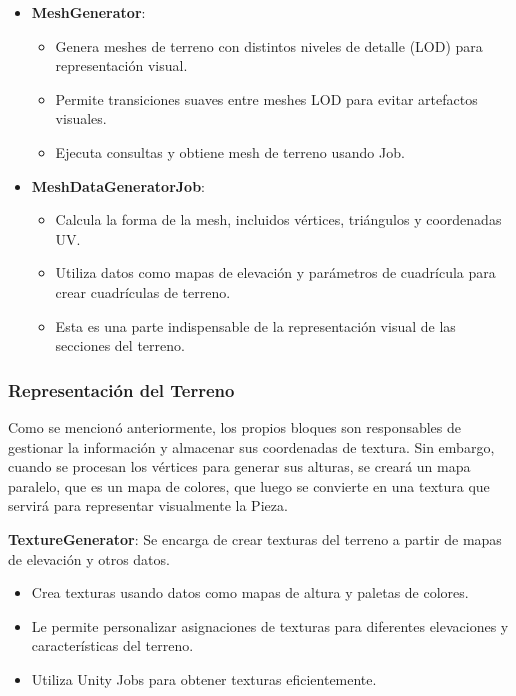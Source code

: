 \begin{itemize}
    \item \textbf{MeshGenerator}:
    \begin{itemize}
        \item Genera meshes de terreno con distintos niveles de detalle (LOD) para representación visual.
	    \item Permite transiciones suaves entre meshes LOD para evitar artefactos visuales.
	    \item Ejecuta consultas y obtiene mesh de terreno usando Job. 

    \end{itemize}

    \item \textbf{MeshDataGeneratorJob}: 
    \begin{itemize}
        \item Calcula la forma de la mesh, incluidos vértices, triángulos y coordenadas UV.
	\item Utiliza datos como mapas de elevación y parámetros de cuadrícula para crear cuadrículas de terreno. 
	\item Esta es una parte indispensable de la representación visual de las secciones del terreno.
    \end{itemize}

\end{itemize}

\subsubsection{Representación del Terreno}

Como se mencionó anteriormente, los propios bloques son responsables de gestionar la información y almacenar sus coordenadas de textura. Sin embargo, cuando se procesan los vértices para generar sus alturas, se creará un mapa paralelo, que es un mapa de colores, que luego se convierte en una textura que servirá para representar visualmente la Pieza.

\item \textbf{TextureGenerator}: Se encarga de crear texturas del terreno a partir de mapas de elevación y otros datos.
\begin{itemize}
    \item Crea texturas usando datos como mapas de altura y paletas de colores.
	\item Le permite personalizar asignaciones de texturas para diferentes elevaciones y características del terreno.
	\item Utiliza Unity Jobs para obtener texturas eficientemente.
\end{itemize}

